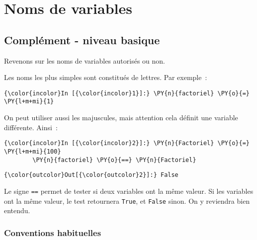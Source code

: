    
    
    
    

    

    \hypertarget{noms-de-variables}{%
\section{Noms de variables}\label{noms-de-variables}}

    \hypertarget{compluxe9ment---niveau-basique}{%
\subsection{Complément - niveau
basique}\label{compluxe9ment---niveau-basique}}

    Revenons sur les noms de variables autorisés ou non.

    Les noms les plus simples sont constitués de lettres. Par exemple~:

    \begin{Verbatim}[commandchars=\\\{\},frame=single,framerule=0.3mm,rulecolor=\color{cellframecolor}]
{\color{incolor}In [{\color{incolor}1}]:} \PY{n}{factoriel} \PY{o}{=} \PY{l+m+mi}{1}
\end{Verbatim}


    On peut utiliser aussi les majuscules, mais attention cela définit une
variable différente. Ainsi~:

    \begin{Verbatim}[commandchars=\\\{\},frame=single,framerule=0.3mm,rulecolor=\color{cellframecolor}]
{\color{incolor}In [{\color{incolor}2}]:} \PY{n}{Factoriel} \PY{o}{=} \PY{l+m+mi}{100}
        \PY{n}{factoriel} \PY{o}{==} \PY{n}{Factoriel}
\end{Verbatim}


\begin{Verbatim}[commandchars=\\\{\},frame=single,framerule=0.3mm,rulecolor=\color{cellframecolor}]
{\color{outcolor}Out[{\color{outcolor}2}]:} False
\end{Verbatim}
            
    Le signe \texttt{==} permet de tester si deux variables ont la même
valeur. Si les variables ont la même valeur, le test retournera
\texttt{True}, et \texttt{False} sinon. On y reviendra bien entendu.

    \hypertarget{conventions-habituelles}{%
\subsubsection{Conventions habituelles}\label{conventions-habituelles}}

